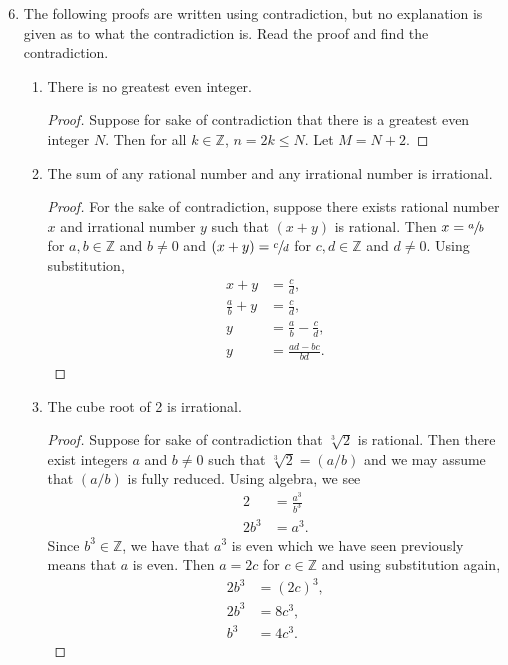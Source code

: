 \documentclass[12 pt]{article}
\newcommand{\Z}{\mathbb{Z}}
\theoremstyle{definition}
\theoremstyle{plain}
\theoremstyle{mytheorem}
\theoremstyle{myexample}
\theoremstyle{mydefinition}
\begin{document}
\begin{enumerate}
\setcounter{enumi}{5}
\item The following proofs are written using contradiction, but no explanation is given as to what the contradiction is.  Read the proof and find the contradiction.
	\begin{enumerate} \itemsep.75in
	\item There is no greatest even integer.
		\begin{proof}  Suppose for sake of contradiction that there is a greatest even integer $N$.  Then for all $k \in \Z$, $n=2k \leq N$.  Let $M = N+2$.
		\end{proof}
	\item The sum of any rational number and any irrational number is irrational.
		\begin{proof}  For the sake of contradiction, suppose there exists rational number $x$ and irrational number $y$ such that $(x+y)$ is rational.  Then $x =\sfrac{a}{b}$ for $a,b \in \Z$ and $b \neq 0$ and $(x+y) = \sfrac{c}{d}$ for $c,d \in \Z$ and $d \neq 0$.  Using substitution, 
			\begin{align*}
			x+y &= \frac{c}{d},\\
			\frac{a}{b} +y &= \frac{c}{d},\\
			y &= \frac{a}{b}-\frac{c}{d}, \\
			y &= \frac{ad-bc}{bd}.
			\end{align*}
		\end{proof}
	\item The cube root of 2 is irrational.
	\begin{proof} Suppose for sake of contradiction that $\sqrt[3]{2}$ is rational.  Then there exist integers $a$ and $b \neq 0$ such that $\sqrt[3]{2} = (a/b)$ and we may assume that $(a/b)$ is fully reduced.  Using algebra, we see
	\begin{align*}
	2 &= \frac{a^3}{b^3} \\
	2b^3 &= a^3.
	\end{align*}
	Since $b^3 \in \Z$, we have that $a^3$ is even which we have seen previously means that $a$ is even.  Then $a = 2c$ for $c \in \Z$ and using substitution again,
	\begin{align*}
	2b^3 &= (2c)^3, \\
	2b^3 &= 8c^3, \\
	b^3 &= 4c^3.
	\end{align*}
	\end{proof}
	\vspace{.75in}
	\end{enumerate}



\end{enumerate}
\end{document}

